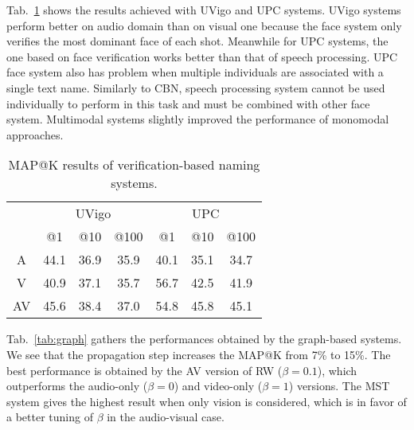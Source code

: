  Tab.~\ref{tab:verification} shows the results achieved with UVigo and UPC systems. UVigo systems perform better on audio domain than on visual one because the face system only verifies the most dominant face of each shot.
%
Meanwhile for UPC systems, the one based on face verification works better than that of speech processing. UPC face system also has problem when multiple individuals are associated with a single text name. Similarly to CBN, speech processing system cannot be used individually to perform in this task and must be combined with other face system.
%
Multimodal systems slightly improved the performance of monomodal approaches.

\begin{table}[tb]
\centering
\caption{MAP@K results of verification-based naming systems.}
\vspace*{-2mm}
\begin{tabular}{c|c|c|c|| c|c|c|}
\cline{2-7}
  &  \multicolumn{3}{|c||}{UVigo} &  \multicolumn{3}{|c|}{UPC} \\ \cline{2-7}
           & @1& @10& @100   & @1& @10& @100 \\ \hline
 \multicolumn{1}{|c|}{A} &  44.1  & 36.9   & 35.9  &  40.1  & 35.1   & 34.7\\ \hline
 \multicolumn{1}{|c|}{V} &  40.9  & 37.1   & 35.7 &  56.7  & 42.5   & 41.9 \\ \hline
 \multicolumn{1}{|c|}{AV} & 45.6 & 38.4 & 37.0 & 54.8 & 45.8 & 45.1 \\ \hline
\end{tabular}
%
\vspace*{-5mm}
\label{tab:verification}
\end{table}

 Tab.~\ref{tab:graph} gathers the performances obtained by the graph-based systems. We see that the propagation step increases the MAP@K from 7\% to 15\%. The best performance is obtained by the AV version of RW ($\beta = 0.1$), which outperforms the audio-only ($\beta = 0$) and video-only ($\beta = 1$) versions. The MST system gives the highest result when only vision is considered, which is in favor of a better tuning of $\beta$ in the audio-visual case.



